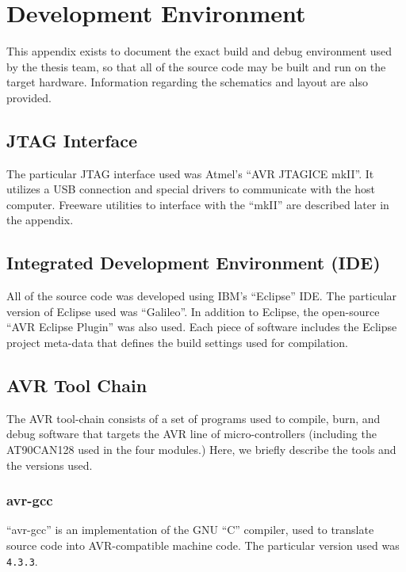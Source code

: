 \chapter{Development Environment}
\label{apx:environment}

This appendix exists to document the exact build and debug environment used by the thesis team, so that all of the source code may be built  and run on the target hardware. Information regarding the schematics and layout are also provided.

\section*{JTAG Interface}

The particular JTAG interface used was Atmel's ``AVR JTAGICE mkII''. It utilizes a USB connection and special drivers to communicate with the host computer. Freeware utilities to interface with the ``mkII'' are described later in the appendix.

\section*{Integrated Development Environment (IDE)}

All of the source code was developed using IBM's ``Eclipse'' IDE. The particular version of Eclipse used was {}``Galileo''. In addition to Eclipse, the open-source {}``AVR Eclipse Plugin'' was also used. Each piece of software includes the Eclipse project meta-data that defines the build settings used for compilation.

\section*{AVR Tool Chain}

The AVR tool-chain consists of a set of programs used to compile, burn, and debug software that targets the AVR line of micro-controllers (including the AT90CAN128 used in the four modules.) Here, we briefly describe the tools and the versions used.

\subsection*{avr-gcc}

{}``avr-gcc'' is an implementation of the GNU ``C'' compiler, used to translate source code into AVR-compatible machine code. The particular version used was \texttt{4.3.3}.

